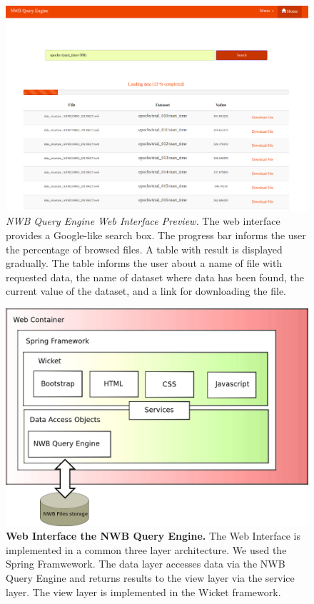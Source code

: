 \documentclass[utf8]{frontiersSCNS} %
\begin{document}
\begin{figure}
  \includegraphics[width=17cm]{nwb-query-engine-web}
\caption{\emph{NWB Query Engine Web Interface Preview.} The web interface provides a Google-like search box. The progress bar informs the user the percentage of browsed files. A table with result is displayed gradually. The table informs the user about a name of file with requested data, the name of dataset where data has been found, the current value of the dataset, and a link for downloading the file.}
\label{fig:web-interface}
\end{figure}

\begin{figure}
  \includegraphics[width=17cm]{web-interface}
\caption{\textbf{Web Interface the NWB Query Engine.} The Web Interface is implemented in a common three layer architecture. We used the Spring Framwework. The data layer accesses data via the NWB Query Engine and returns results to the view layer via the service layer. The view layer is implemented in the Wicket framework.}
\label{fig:architecture}
\end{figure}
\end{document}
